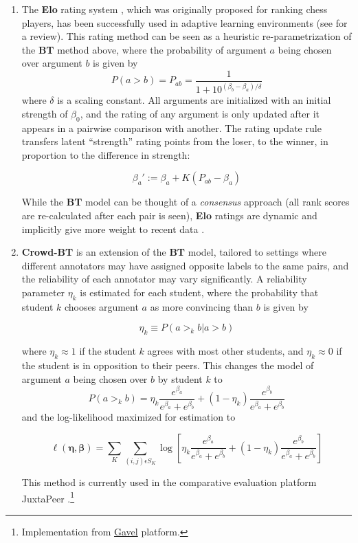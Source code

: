 \documentclass[notitlepage,12pt]{jedm}
\begin{document}
\begin{enumerate}
	
	\item The \textbf{Elo} rating system \cite{elo_rating_1978}, which was 
	originally proposed for ranking chess players, has been successfully used 
	in adaptive learning environments (see  
	for 
	a review). 
	This rating method can be seen as a heuristic re-parametrization of the 
	\textbf{BT} method above, where the probability of argument $a$ being 
	chosen over argument $b$ is given by
	$$
	P(a>b) = P_{ab} = \frac{1}{1+10^{(\beta_b-\beta_a)/\delta}}
	$$
	where $\delta$ is a scaling constant. 
	All arguments are initialized with an initial strength of $\beta_0$, and 
	the rating of any argument is only updated after it appears in a pairwise 
	comparison with another.
	The rating update rule transfers latent ``strength'' rating points from the 
	loser, to the winner, in proportion to the difference in strength:
	
	$$
	\beta_a':=\beta_a+K(P_{ab} - \beta_a)
	$$
	
	While the \textbf{BT} model can be thought of a \textit{consensus} 
	approach (all rank scores are re-calculated after each pair is seen), 
	\textbf{Elo} ratings are dynamic and implicitly give more weight 
	to recent data \cite{aldous_elo_2017}.
	
	\item \textbf{Crowd-BT} \cite{chen_pairwise_2013} is an extension of the 
	\textbf{BT} model, tailored to settings where different annotators may have 
	assigned opposite labels to the same pairs, and the reliability of each 
	annotator may vary significantly. 
	A reliability parameter $\eta_k$ is estimated for each student, where the 
	probability that student $k$ chooses argument $a$ as more convincing than 
	$b$ is given by 
	
	$$
	\eta_k \equiv P(a >_k b | a >b )
	$$
	
	where $\eta_k \approx 1$ if the student  $k$ agrees with most other 
	students, and $\eta_k \approx 0$ if the student is in opposition to their 
	peers.
	This changes the model of argument $a$ being chosen over $b$ by student $k$ 
	to 
	$$
	P(a >_k b) = 
	\eta_k \frac{e^{\beta_a}}{e^{\beta_a}+e^{\beta_b}} + (1-\eta_k) 
	\frac{e^{\beta_b}}{e^{\beta_a}+e^{\beta_b}}
	$$
	and the log-likelihood maximized for estimation to 
	
	$$
	\ell(\boldsymbol{\eta},\boldsymbol{\beta})=\sum_{K}\sum_{(i,j)\epsilon 
		S_K}^{} 
	\log \left[ \eta_k \frac{e^{\beta_a}}{e^{\beta_a}+e^{\beta_b}} + (1-\eta_k) 
	\frac{e^{\beta_b}}{e^{\beta_a}+e^{\beta_b}} \right]
	$$
	
	This method is currently used in the comparative evaluation platform 
	JuxtaPeer \cite{cambre_juxtapeer:_2018}.\footnote{Implementation from 
	\href{https://github.com/anishathalye/gavel/blob/master/gavel/crowd_bt.py}{Gavel}
	 platform.}
	
\end{enumerate}
\end{document}
